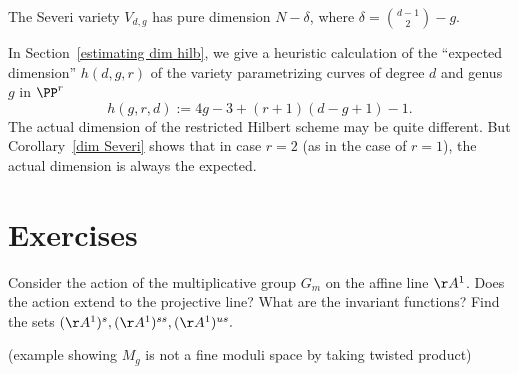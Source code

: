 \begin{corollary}\label{dim Severi}
The  Severi variety $V_{d,g}$ has pure dimension $N - \delta$, where $\delta = \binom{d-1}{2} - g$.
\end{corollary}

In Section~\ref{estimating dim hilb}, we give a heuristic calculation of the ``expected dimension'' $h(d,g,r)$ of the variety parametrizing curves of degree $d$ and genus $g$ in $\PP^r$
$$
h(g,r,d) := 4g-3 + (r+1)(d-g+1) - 1.
$$
The actual dimension of the restricted Hilbert scheme may be quite different. But  Corollary~\ref{dim Severi} shows that in case $r=2$ (as in the case of $r=1$), the actual dimension is always the expected.



\section{Exercises}

\begin{exercise}
Consider the action of the multiplicative group $G_m$ on the affine line $\AA^1$. Does the action extend
to the projective line? What are the invariant functions? Find the sets $(\AA^1)^s, (\AA^1)^{ss}, (\AA^1)^{us}.$
\end{exercise}

\begin{exercise}
(example showing $M_g$ is not a fine moduli space by taking twisted product)
\end{exercise}



